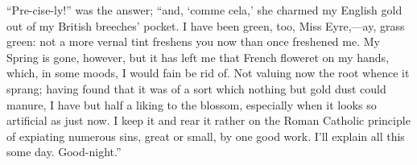 \enquote{Pre-cise-ly!} was the answer; \enquote{and, \foreignquote{french}{comme
cela,} she charmed my English gold out of my British breeches' pocket. 
I have been green, too, Miss Eyre,---ay, grass green: not a more vernal
tint freshens you now than once freshened me. My Spring is gone,
however, but it has left me that French floweret on my hands, which, in
some moods, I would fain be rid of. Not valuing now the root whence it
sprang; having found that it was of a sort which nothing but gold dust
could manure, I have but half a liking to the blossom, especially when
it looks so artificial as just now. I keep it and rear it rather on the
Roman Catholic principle of expiating numerous sins, great or small, by
one good work. I'll explain all this some day. Good-night.}

